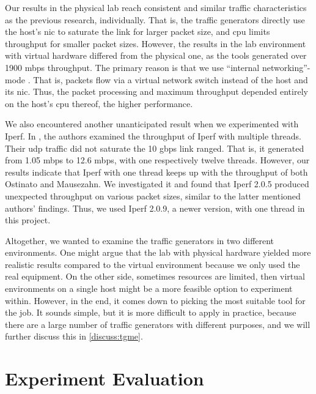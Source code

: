 \skippara Our results in the physical lab reach consistent and similar traffic characteristics as the previous research, \cite{kolahi2011performance, srivastava2014evaluation, srivastava2014comparative} individually.
That is, the traffic generators directly use the host's \acrshort{nic} to saturate the link for larger packet size, and \acrshort{cpu} limits throughput for smaller packet sizes.
However, the results in the lab environment with virtual hardware differed from the physical one, as the tools generated over 1900 \acrshort{mbps} throughput.
The primary reason is that we use ``internal networking''-mode \cite{Chapter680:online}.
That is, packets flow via a virtual network switch instead of the host and its \acrshort{nic}.
Thus, the packet processing and maximum throughput depended entirely on the host's \acrshort{cpu} thereof, the higher performance.

\skippara We also encountered another unanticipated result when we experimented with Iperf.
In \cite{srivastava2014comparative}, the authors examined the throughput of Iperf with multiple threads.
Their \acrshort{udp} traffic did not saturate the 10 \acrshort{gbps} link ranged.
That is, it generated from 1.05 \acrshort{mbps} to 12.6 \acrshort{mbps}, with one respectively twelve threads.
However, our results indicate that Iperf with one thread keeps up with the throughput of both Ostinato and Mausezahn.
We investigated it and found that Iperf 2.0.5 produced unexpected throughput on various packet sizes, similar to the latter mentioned authors' findings.
Thus, we used Iperf 2.0.9, a newer version, with one thread in this project.

\skippara Altogether, we wanted to examine the traffic generators in two different environments.
One might argue that the lab with physical hardware yielded more realistic results compared to the virtual environment because we only used the real equipment.
On the other side, sometimes resources are limited, then virtual environments on a single host might be a more feasible option to experiment within.
However, in the end, it comes down to picking the most suitable tool for the job.
It sounds simple, but it is more difficult to apply in practice, because there are a large number of traffic generators with different purposes, and we will further discuss this in \cref{discuss:tgme}.

\section{Experiment Evaluation}

